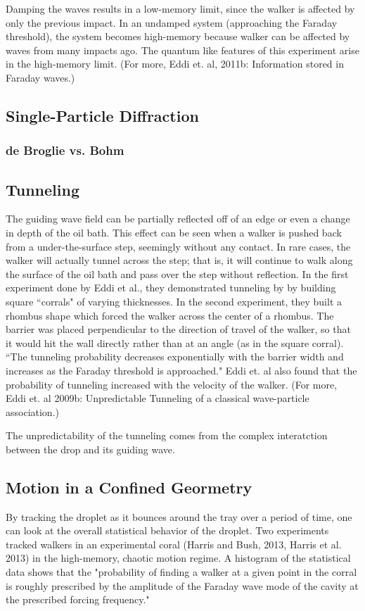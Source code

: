             Damping the waves results in a low-memory limit, since the walker is affected by only the previous impact. In an undamped system (approaching the Faraday threshold), the system becomes high-memory because walker can be affected by waves from many impacts ago. The quantum like features of this experiment arise in the high-memory limit. (For more, Eddi et. al, 2011b: Information stored in Faraday waves.) 

            \subsection{Single-Particle Diffraction}


\subsubsection{de Broglie vs. Bohm}
	       \subsection{Tunneling}
	       The guiding wave field can be partially reflected off of an edge or even a change in depth of the oil bath. This effect can be seen when a walker is pushed back from a under-the-surface step, seemingly without any contact. In rare cases, the walker will actually tunnel across the step; that is, it will continue to walk along the surface of the oil bath and pass over the step without reflection. In the first experiment done by Eddi et al., they demonstrated tunneling by by building square ``corrals" of varying thicknesses. In the second experiment, they built a rhombus shape which forced the walker across the center of a rhombus. The barrier was placed perpendicular to the direction of travel of the walker, so that it would hit the wall directly rather than at an angle (as in the square corral). ``The tunneling probability decreases exponentially with the barrier width and increases as the Faraday threshold is approached." Eddi et. al also found that the probability of tunneling increased with the velocity of the walker. (For more, Eddi et. al 2009b: Unpredictable Tunneling of a classical wave-particle association.)
	       
	       
	        The unpredictability of the tunneling comes from the complex interatction between the drop and its guiding wave. 

\subsection{Motion in a Confined Geormetry}
By tracking the droplet as it bounces around the tray over a period of time, one can look at the overall statistical behavior of the droplet. Two experiments tracked walkers in an experimental coral (Harris and Bush, 2013, Harris et al. 2013) in the high-memory, chaotic motion regime. A histogram of the statistical data shows that the "probability of finding a walker at a given point in the corral is roughly prescribed by the amplitude of the Faraday wave mode of the cavity at the prescribed forcing frequency."

